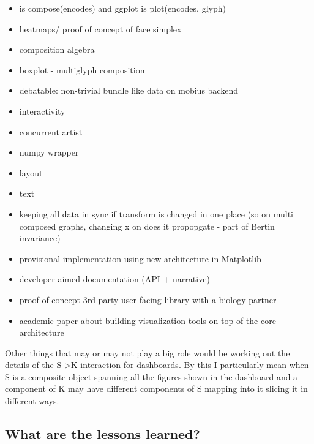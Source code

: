 \documentclass[../main.tex]{subfiles}
\begin{document}
\begin{itemize}
    \item is compose(encodes) and ggplot is plot(encodes, glyph)
    \item heatmaps/ proof of concept of face simplex
    \item composition algebra
    \item boxplot - multiglyph composition
    \item debatable: non-trivial bundle like data on mobius backend
    \item interactivity 
    \item concurrent artist
    \item numpy wrapper
    \item layout
    \item text
    \item keeping all data in sync if transform is changed in one place (so on multi composed graphs, changing x on does it propopgate - part of Bertin invariance)
\end{itemize}
\begin{itemize}
    \item provisional implementation using new architecture in Matplotlib
    \item developer-aimed documentation (API + narrative)
    \item proof of concept 3rd party user-facing library with a biology partner
    \item academic paper about building visualization tools on top of the core architecture
\end{itemize}

Other things that may or may not play a big role would be working out the details of the S->K interaction for dashboards. By this I particularly mean when S is a composite object spanning all the figures shown in the dashboard and a component of K may have different components of S mapping into it slicing it in different ways.
\subsection{What are the lessons learned?}
\end{document}
